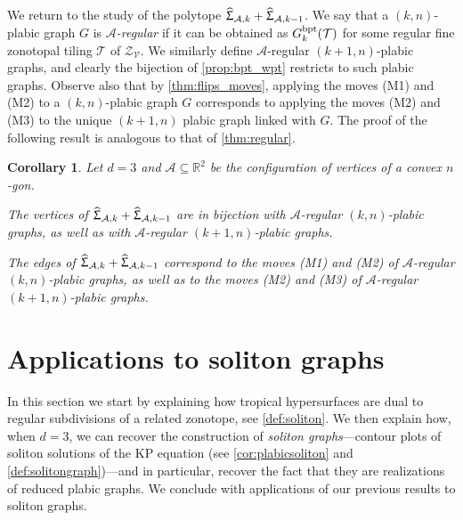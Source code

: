 \documentclass[11pt]{amsart}
\theoremstyle{plain}
\newtheorem{corollary}[theorem]{Corollary}
\theoremstyle{definition}
\def\R{\mathbb{R}}
\def\A{\mathcal{A}}
\def\V{\mathcal{V}}
\def\Zon{\mathcal{Z}}
\def\ZV{\Zon_\V}
\def\HSP{\widehat\Upsigma}
\def\Sigma{\HSP}
\def\Tcal{\mathcal{T}}
\def\Tiling{\Tcal}
\let\subset\subseteq
\begin{document}
We return to the study of the polytope $\Sigma_{\A,k}+\Sigma_{\A,k-1}$. We say that a \bpt $(k,n)$-plabic graph $G$ is \emph{$\A$-regular} if it can be obtained as $\Gbpt_k(\Tiling)$ for some regular fine zonotopal tiling $\Tiling$ of $\ZV$. We similarly define $\A$-regular \wpt $(k+1,n)$-plabic graphs, and clearly the bijection of \cref{prop:bpt_wpt} restricts to such plabic graphs. Observe also that by \cref{thm:flips_moves}, applying the moves (M1) and (M2) to a \bpt $(k,n)$-plabic graph $G$ corresponds to applying the moves (M2) and (M3) to the unique $(k+1,n)$ \wpt plabic graph  linked with $G$. The proof of the following result is analogous to that of \cref{thm:regular}.

\begin{corollary} Let $d=3$ and $\A\subset\R^2$ be the configuration of vertices of a convex $n$-gon.
\begin{theoremlist}
\item The vertices of $\Sigma_{\A,k}+\Sigma_{\A,k-1}$ are in bijection with $\A$-regular \bpt $(k,n)$-plabic graphs, as well as with $\A$-regular \wpt $(k+1,n)$-plabic graphs.
\item The edges  of $\Sigma_{\A,k}+\Sigma_{\A,k-1}$ correspond to the moves (M1) and (M2) of $\A$-regular \bpt $(k,n)$-plabic graphs,  as well as to the moves (M2) and (M3) of $\A$-regular \wpt $(k+1,n)$-plabic graphs.
\end{theoremlist}
\end{corollary}




\def\X{\bm{X}}
\section{Applications to soliton graphs}

In this section we start by explaining how tropical hypersurfaces are dual to regular subdivisions
of a related zonotope, see 
	\cref{def:soliton}.  We then explain how, when $d=3$, we can  recover
 the construction of \emph{soliton graphs}---contour plots of soliton solutions of the KP equation (see \cref{cor:plabicsoliton} and \cref{def:solitongraph})---and in particular, recover the fact that 
	they are realizations of reduced plabic graphs.  
	We 
conclude with applications of our previous results to soliton graphs.
\end{document}
